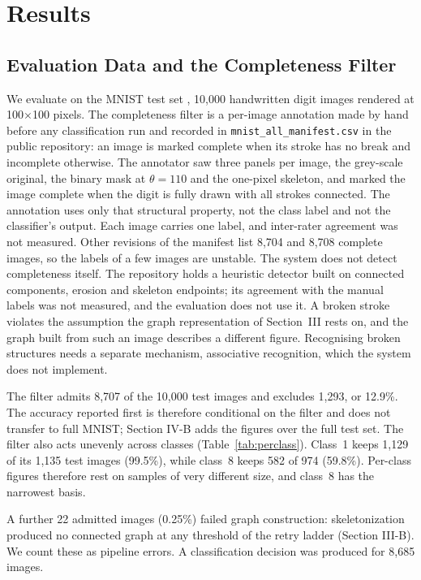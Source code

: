 \section{Results}

\subsection{Evaluation Data and the Completeness Filter}

We evaluate on the MNIST test set \cite{lecun1998}, 10,000 handwritten digit
images rendered at 100$\times$100 pixels. The completeness filter is a per-image
annotation made by hand before any classification run and recorded in
\texttt{mnist\_all\_manifest.csv} in the public repository: an image is marked
complete when its stroke has no break and incomplete otherwise. The annotator
saw three panels per image, the grey-scale original, the binary mask at
$\theta = 110$ and the one-pixel skeleton, and marked the image complete when
the digit is fully drawn with all strokes connected. The annotation
uses only that structural property, not the class label and not the
classifier's output. Each image carries one label, and inter-rater agreement
was not measured. Other revisions of the manifest list 8,704 and 8,708
complete images, so the labels of a few images are unstable. The system does
not detect completeness itself. The repository holds a heuristic detector built
on connected components, erosion and skeleton endpoints; its agreement with the
manual labels was not measured, and the evaluation does not use it. A broken stroke
violates the assumption the graph representation of Section~III rests on, and
the graph built from such an image describes a different figure. Recognising
broken structures needs a separate mechanism, associative recognition, which
the system does not implement.

The filter admits 8,707 of the 10,000 test images and excludes 1,293, or
12.9\%. The accuracy reported first is therefore conditional on the filter
and does not transfer to full MNIST; Section IV-B adds the figures over the
full test set. The filter also acts unevenly across
classes (Table~\ref{tab:perclass}). Class~1 keeps 1,129 of its 1,135 test
images (99.5\%), while class~8 keeps 582 of 974 (59.8\%). Per-class figures
therefore rest on samples of very different size, and class~8 has the narrowest
basis.

A further 22 admitted images (0.25\%) failed graph construction:
skeletonization produced no connected graph at any threshold of the retry
ladder (Section III-B). We count these as pipeline
errors. A classification decision was produced for 8,685 images.

